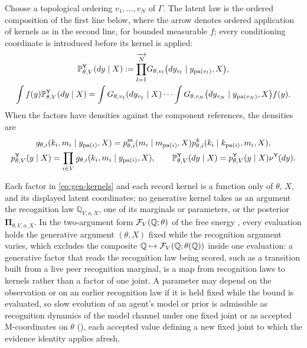 Choose a topological ordering $v_1,\ldots,v_N$ of $\Gamma$. The latent law is the ordered composition of
the first line below, where the arrow denotes ordered application of kernels as in the second line, for
bounded measurable $f$; every conditioning coordinate is introduced before its kernel is applied:
\begin{gather}
\mathbb P_{\theta,V}^{\mathsf Y}(dy\mid X)
:=\overrightarrow{\prod_{l=1}^{N}}
G_{\theta,v_l}\bigl(dy_{v_l}\mid y_{\operatorname{pa}(v_l)},X\bigr),
\label{eq:gen-composition}\\
\int f(y)\mathbb P_{\theta,V}^{\mathsf Y}(dy\mid X)
=\int G_{\theta,v_1}(dy_{v_1}\mid X)\cdots
\int G_{\theta,v_N}\bigl(dy_{v_N}\mid y_{\operatorname{pa}(v_N)},X\bigr)f(y).
\label{eq:gen-iterated-integral}
\end{gather}
When the factors have densities against the component references, the densities are
\begin{gather}
g_{\theta,i}(k_i,m_i\mid y_{\operatorname{pa}(i)},X)
=p_{\theta,i}^{m}(m_i\mid m_{\operatorname{pa}(i)},X)p_{\theta,i}^{k}(k_i\mid k_{\operatorname{pa}(i)},m_i,X),
\label{eq:gen-density}\\
p_{\theta,V}^{\mathsf Y}(y\mid X)=\prod_{i\in V}g_{\theta,i}(k_i,m_i\mid y_{\operatorname{pa}(i)},X),
\qquad
\mathbb P_{\theta,V}^{\mathsf Y}(dy\mid X)=p_{\theta,V}^{\mathsf Y}(y\mid X)\nu^{\mathsf Y}(dy).
\label{eq:gen-design-density}
\end{gather}

Each factor in \eqref{eq:gen-kernels} and each record kernel is a function only of $\theta$, $X$, and its
displayed latent coordinates; no generative kernel takes as an argument the recognition law
$\mathbb Q_{V,o,X}$, one of its marginals or parameters, or the posterior $\boldsymbol\Pi_{\theta,V,o,X}$. In
the two-argument form $\mathcal F_V(\mathbb Q;\theta)$ of the free energy \citep{Neal1998}, every evaluation
holds the generative argument $(\theta,X)$ fixed while the recognition argument varies, which excludes the
composite $\mathbb Q\mapsto\mathcal F_V(\mathbb Q;\theta(\mathbb Q))$ inside one evaluation: a generative
factor that reads the recognition law being scored, such as a transition built from a live peer
recognition marginal, is a map from recognition laws to kernels rather than a factor of one joint. A
parameter may depend on the observation or on an earlier recognition law if it is held fixed while the
bound is evaluated, so slow evolution of an agent's model or prior is admissible as recognition dynamics
of the model channel under one fixed joint or as accepted M-coordinates on $\theta$
(),
each accepted value defining a new fixed joint to which the evidence identity applies afresh.

